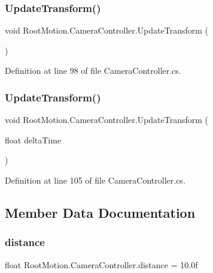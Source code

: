 \subsubsection{\texorpdfstring{Update\+Transform()}{UpdateTransform()}\hspace{0.1cm}{\footnotesize\ttfamily [1/2]}}
{\footnotesize\ttfamily void Root\+Motion.\+Camera\+Controller.\+Update\+Transform (\begin{DoxyParamCaption}{ }\end{DoxyParamCaption})}



Definition at line 98 of file Camera\+Controller.\+cs.

\mbox{\label{class_root_motion_1_1_camera_controller_a850110738716494db56b7e0e2e8e5a3a}} 
\subsubsection{\texorpdfstring{Update\+Transform()}{UpdateTransform()}\hspace{0.1cm}{\footnotesize\ttfamily [2/2]}}
{\footnotesize\ttfamily void Root\+Motion.\+Camera\+Controller.\+Update\+Transform (\begin{DoxyParamCaption}\item[{float}]{delta\+Time }\end{DoxyParamCaption})}



Definition at line 105 of file Camera\+Controller.\+cs.



\subsection{Member Data Documentation}
\mbox{\label{class_root_motion_1_1_camera_controller_a385f66995014ea5fd9b5d8e038346798}} 
\subsubsection{\texorpdfstring{distance}{distance}}
{\footnotesize\ttfamily float Root\+Motion.\+Camera\+Controller.\+distance = 10.\+0f}



